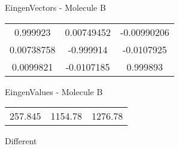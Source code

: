 \begin{multicols}{2}
\begin{center}
\vtab
 EingenVectors - Molecule B     \\
\vtab
\begin{tabular}{|c c c|}
0.999923	 & 	0.00749452	 & 	-0.00990206	 \\
0.00738758	 & 	-0.999914	 & 	-0.0107925	 \\
0.0099821	 & 	-0.0107185	 & 	0.999893
\end{tabular}

\vtab
 EingenValues - Molecule B     \\
\vtab
\begin{tabular}{|c c c|}
257.845	 & 	1154.78	 & 	1276.78	 \\
\end{tabular}

\end{center}
\end{multicols}
\begin{center}
\vtab
\vtab
\textcolor{NavyBlue}{\Large Different}
\end{center}

 \newpage

